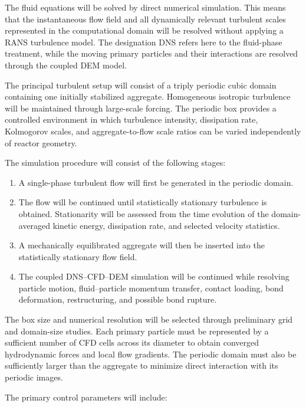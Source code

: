 \documentclass[11pt,a4paper,twoside]{scrartcl}
\begin{document}
The fluid equations will be solved by direct numerical simulation. This means that the instantaneous flow field and all dynamically relevant turbulent scales represented in the computational domain will be resolved without applying a RANS turbulence model. The designation DNS refers here to the fluid-phase treatment, while the moving primary particles and their interactions are resolved through the coupled DEM model.

The principal turbulent setup will consist of a triply periodic cubic domain containing one initially stabilized aggregate. Homogeneous isotropic turbulence will be maintained through large-scale forcing. The periodic box provides a controlled environment in which turbulence intensity, dissipation rate, Kolmogorov scales, and aggregate-to-flow scale ratios can be varied independently of reactor geometry.

The simulation procedure will consist of the following stages:

\begin{enumerate}
	\item A single-phase turbulent flow will first be generated in the periodic domain.
	
	\item The flow will be continued until statistically stationary turbulence is obtained. Stationarity will be assessed from the time evolution of the domain-averaged kinetic energy, dissipation rate, and selected velocity statistics.
	
	\item A mechanically equilibrated aggregate will then be inserted into the statistically stationary flow field.
	
	\item The coupled DNS--CFD--DEM simulation will be continued while resolving particle motion, fluid--particle momentum transfer, contact loading, bond deformation, restructuring, and possible bond rupture.
\end{enumerate}

The box size and numerical resolution will be selected through preliminary grid and domain-size studies. Each primary particle must be represented by a sufficient number of CFD cells across its diameter to obtain converged hydrodynamic forces and local flow gradients. The periodic domain must also be sufficiently larger than the aggregate to minimize direct interaction with its periodic images.

The primary control parameters will include:
\end{document}
